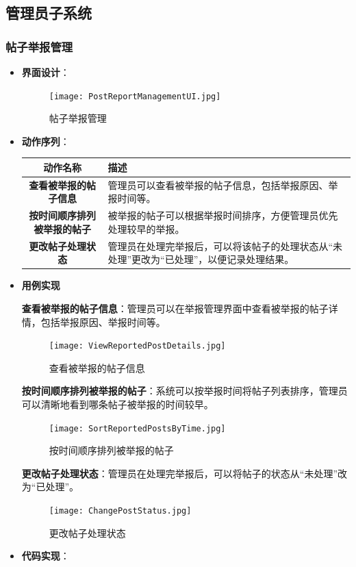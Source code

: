 \subsection{管理员子系统}

\subsubsection{帖子举报管理}

\begin{itemize}
	\item \textbf{界面设计}：
	\begin{figure}[H]
		\centering
		\texttt{[image: PostReportManagementUI.jpg]}
		\caption{帖子举报管理}
	\end{figure}
	\item \textbf{动作序列}：
	\begin{table}[H]
		\centering
		\renewcommand\arraystretch{1.5}
		\begin{tabular}{|c|>{\raggedright\arraybackslash}p{10cm}|}
			\hline
			\textbf{动作名称} & \textbf{描述} \\ \hline
			\textbf{查看被举报的帖子信息} & 管理员可以查看被举报的帖子信息，包括举报原因、举报时间等。\\ \hline
			\textbf{按时间顺序排列被举报的帖子} & 被举报的帖子可以根据举报时间排序，方便管理员优先处理较早的举报。\\ \hline
			\textbf{更改帖子处理状态} & 管理员在处理完举报后，可以将该帖子的处理状态从“未处理”更改为“已处理”，以便记录处理结果。\\ \hline
		\end{tabular}
	\end{table}
	
	\item \textbf{用例实现}
	
	\textbf{查看被举报的帖子信息}：管理员可以在举报管理界面中查看被举报的帖子详情，包括举报原因、举报时间等。
	
	\begin{figure}[H]
		\centering
		\texttt{[image: ViewReportedPostDetails.jpg]}
		\caption{查看被举报的帖子信息}
	\end{figure}
	
	\textbf{按时间顺序排列被举报的帖子}：系统可以按举报时间将帖子列表排序，管理员可以清晰地看到哪条帖子被举报的时间较早。
	
	\begin{figure}[H]
		\centering
		\texttt{[image: SortReportedPostsByTime.jpg]}
		\caption{按时间顺序排列被举报的帖子}
	\end{figure}
	
	\textbf{更改帖子处理状态}：管理员在处理完举报后，可以将帖子的状态从“未处理”改为“已处理”。
	
	\begin{figure}[H]
		\centering
		\texttt{[image: ChangePostStatus.jpg]}
		\caption{更改帖子处理状态}
	\end{figure}
	
	\item \textbf{代码实现}：
	
\end{itemize}

